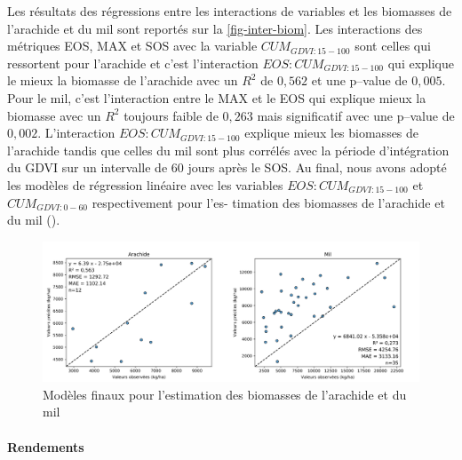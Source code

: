 Les résultats des régressions entre les interactions de variables et les biomasses de
l’arachide et du mil sont reportés sur la \cref{fig-inter-biom}. Les interactions des métriques
EOS, MAX et SOS avec la variable $CUM_{GDVI:15-100}$ sont celles qui ressortent pour
l’arachide et c’est l’interaction $EOS:CUM_{GDVI:15-100}$ qui explique le mieux la biomasse de l’arachide avec un $R^{2}$ de $0,562$ et une p--value de $0,005$. Pour le mil, c’est
l’interaction entre le MAX et le EOS qui explique mieux la biomasse avec un $R^{2}$
toujours faible de $0,263$ mais significatif avec une p--value de $0,002$. L’interaction
$EOS:CUM_{GDVI:15-100}$ explique mieux les biomasses de l’arachide tandis que celles
du mil sont plus corrélés avec la période d’intégration du GDVI sur un intervalle de
60 jours après le SOS. Au final, nous avons adopté les modèles de régression linéaire
avec les variables $EOS:CUM_{GDVI:15-100}$ et $CUM_{GDVI:0-60}$ respectivement pour l’es-
timation des biomasses de l’arachide et du mil ().

\begin{figure}[htbp]
 \begin{center}
  \includegraphics[scale=0.6]{resultats_discussions/Model_Biom.png} 
 \end{center}
 \caption[Modèles finaux pour l’estimation des biomasses]{Modèles finaux pour l’estimation des biomasses de l’arachide et du mil}
 \label{fig-model-biom}
\end{figure}

\paragraph{Rendements} 

